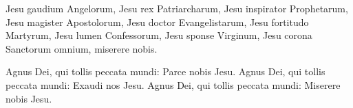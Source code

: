 \documentclass[parskip=full]{scrreprt}
\newif\iftemplate\templatetrue
\begin{document}
Jesu gaudium Angelorum,
Jesu rex Patriarcharum,
Jesu inspirator Prophetarum,
Jesu magister Apostolorum,
Jesu doctor Evangelistarum,
Jesu fortitudo Martyrum,
Jesu lumen Confessorum,
Jesu sponse Virginum,
Jesu corona Sanctorum omnium,
miserere nobis.

Agnus Dei, qui tollis peccata mundi: Parce nobis Jesu.
Agnus Dei, qui tollis peccata mundi: Exaudi nos Jesu.
Agnus Dei, qui tollis peccata mundi: Miserere nobis Jesu.

\cleardoublepage
\fi

\iftemplate

\fi
\end{document}
